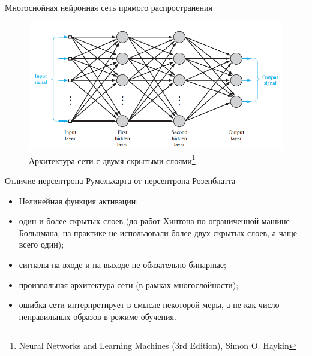 \documentclass[10pt]{beamer}
\begin{document}
\begin{frame}{Многоснойная нейронная сеть прямого распространения}

\begin{figure}[h!]
  \centering
  \includegraphics[width=1\textwidth]{images/mlp.png}
  \caption{Архитектура сети с двумя скрытыми слоями\footnote{Neural Networks and Learning Machines (3rd Edition), Simon O. Haykin}}
\end{figure}

\end{frame}

\begin{frame}{Отличие персептрона Румельхарта от персептрона Розенблатта}

\begin{itemize}
	\item Нелинейная функция активации;
	\item один и более скрытых слоев (до работ Хинтона по ограниченной машине Больцмана, на практике не использовали более двух скрытых слоев, а чаще всего один);
	\item сигналы на входе и на выходе не обязательно бинарные;
	\item произвольная архитектура сети (в рамках многослойности);
	\item ошибка сети интерпретирует в смысле некоторой меры, а не как число неправильных образов в режиме обучения.
\end{itemize}

\end{frame}
\end{document}
